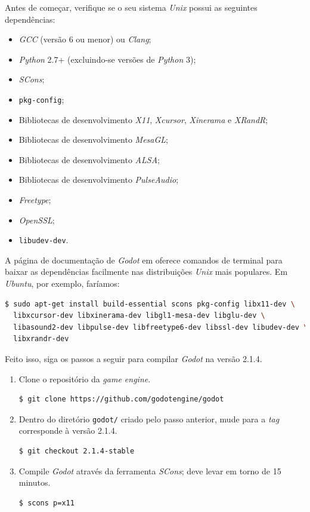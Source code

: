 Antes de começar, verifique se o seu sistema \textit{Unix} possui as seguintes dependências:

\begin{itemize}
\item \textit{GCC} (versão 6 ou menor) ou \textit{Clang};
\item \textit{Python} 2.7+ (excluindo-se versões de \textit{Python} 3);
\item \textit{SCons};
\item \texttt{pkg-config};
\item Bibliotecas de desenvolvimento \textit{X11}, \textit{Xcursor}, \textit{Xinerama} e \textit{XRandR};
\item Bibliotecas de desenvolvimento \textit{MesaGL};
\item Bibliotecas de desenvolvimento \textit{ALSA};
\item Bibliotecas de desenvolvimento \textit{PulseAudio};
\item \textit{Freetype};
\item \textit{OpenSSL};
\item \texttt{libudev-dev}.
\end{itemize}

A página de documentação de \textit{Godot} em \citep{godotReq} oferece comandos de terminal para baixar as dependências facilmente nas distribuições \textit{Unix} mais populares. Em \textit{Ubuntu}, por exemplo, faríamos:

\begin{lstlisting}[language=Bash]
$ sudo apt-get install build-essential scons pkg-config libx11-dev \
  libxcursor-dev libxinerama-dev libgl1-mesa-dev libglu-dev \
  libasound2-dev libpulse-dev libfreetype6-dev libssl-dev libudev-dev \
  libxrandr-dev
\end{lstlisting}

Feito isso, siga os passos a seguir para compilar \textit{Godot} na versão 2.1.4.

\begin{enumerate}
\item Clone o repositório da \textit{game engine}.

\begin{lstlisting}[language=Bash]
$ git clone https://github.com/godotengine/godot
\end{lstlisting}

\item Dentro do diretório \texttt{godot/} criado pelo passo anterior, mude para a \textit{tag} corresponde à versão 2.1.4.

\begin{lstlisting}[language=Bash]
$ git checkout 2.1.4-stable
\end{lstlisting}

\item Compile \textit{Godot} através da ferramenta \textit{SCons}; deve levar em torno de 15 minutos.

\begin{lstlisting}[language=Bash]
$ scons p=x11
\end{lstlisting}
\end{enumerate}


